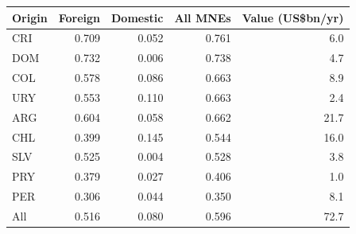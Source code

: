 \begin{tabular}{lrrrr}
\toprule
Origin & Foreign & Domestic & All MNEs & Value (US\$bn/yr) \\
\midrule
CRI & 0.709 & 0.052 & 0.761 & 6.0 \\
DOM & 0.732 & 0.006 & 0.738 & 4.7 \\
COL & 0.578 & 0.086 & 0.663 & 8.9 \\
URY & 0.553 & 0.110 & 0.663 & 2.4 \\
ARG & 0.604 & 0.058 & 0.662 & 21.7 \\
CHL & 0.399 & 0.145 & 0.544 & 16.0 \\
SLV & 0.525 & 0.004 & 0.528 & 3.8 \\
PRY & 0.379 & 0.027 & 0.406 & 1.0 \\
PER & 0.306 & 0.044 & 0.350 & 8.1 \\
\midrule
All & 0.516 & 0.080 & 0.596 & 72.7 \\
\bottomrule
\end{tabular}
